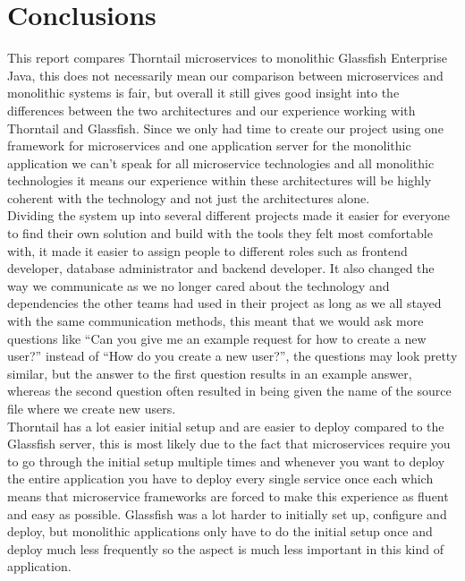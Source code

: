 \section{Conclusions}
\label{sec:conclusion}

This report compares Thorntail microservices to monolithic Glassfish Enterprise Java, this does not necessarily mean our comparison between microservices and monolithic systems is fair, but overall it still gives good insight into the differences between the two architectures and our experience working with Thorntail and Glassfish. Since we only had time to create our project using one framework for microservices and one application server for the monolithic application we can’t speak for all microservice technologies and all monolithic technologies it means our experience within these architectures will be highly coherent with the technology and not just the architectures alone. \\

Dividing the system up into several different projects made it easier for everyone to find their own solution and build with the tools they felt most comfortable with, it made it easier to assign people to different roles such as frontend developer, database administrator and backend developer. It also changed the way we communicate as we no longer cared about the technology and dependencies the other teams had used in their project as long as we all stayed with the same communication methods, this meant that we would ask more questions like “Can you give me an example request for how to create a new user?” instead of “How do you create a new user?”, the questions may look pretty similar, but the answer to the first question results in an example answer, whereas the second question often resulted in being given the name of the source file where we create new users.\\

Thorntail has a lot easier initial setup and are easier to deploy compared to the Glassfish server, this is most likely due to the fact that microservices require you to go through the initial setup multiple times and whenever you want to deploy the entire application you have to deploy every single service once each which means that microservice frameworks are forced to make this experience as fluent and easy as possible. Glassfish was a lot harder to initially set up, configure and deploy, but monolithic applications only have to do the initial setup once and deploy much less frequently so the aspect is much less important in this kind of application.\\

